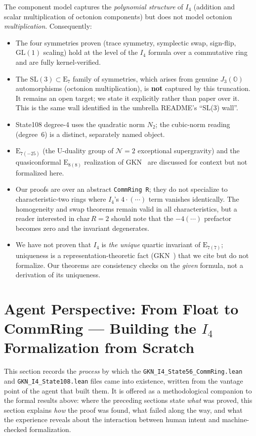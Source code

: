 \documentclass[11pt]{article}
\theoremstyle{definition}
\newcommand{\OO}{\mathbb{O}}
\newcommand{\Jthree}{J_3(\OO)}
\newcommand{\Iq}{I_4}
\newcommand{\Esevenc}{\mathrm{E}_{7(7)}}
\begin{document}
The component model captures the \emph{polynomial structure} of $\Iq$ (addition
and scalar multiplication of octonion components) but does not model octonion
\emph{multiplication}. Consequently:
\begin{itemize}[leftmargin=2em]
\item The four symmetries proven (trace symmetry, symplectic swap, sign-flip,
$\mathrm{GL}(1)$ scaling) hold at the level of the $\Iq$ formula over a
commutative ring and are fully kernel-verified.
\item The $\mathrm{SL}(3)\subset\mathrm{E}_7$ family of symmetries, which
arises from genuine $\Jthree$ automorphisms (octonion multiplication), is
\textbf{not} captured by this truncation. It remains an open target; we state
it explicitly rather than paper over it. This is the same wall identified in
the umbrella README's ``SL(3) wall''.
\item State108 degree-4 uses the quadratic norm $N_2$; the cubic-norm reading
(degree~6) is a distinct, separately named object.
\item $\mathrm{E}_{7(-25)}$ (the U-duality group of $\mathcal{N}=2$
exceptional supergravity) and the quasiconformal $\mathrm{E}_{8(8)}$
realization of GKN~\cite{gkn2001} are discussed for context but not
formalized here.
\item Our proofs are over an abstract \texttt{CommRing R}; they do not specialize
to characteristic-two rings where $\Iq$'s $4\cdot(\cdots)$ term vanishes
identically. The homogeneity and swap theorems remain valid in all
characteristics, but a reader interested in $\mathrm{char}\,R=2$ should note
that the $-4(\cdots)$ prefactor becomes zero and the invariant degenerates.
\item We have not proven that $\Iq$ is \emph{the unique} quartic invariant of
$\Esevenc$; uniqueness is a representation-theoretic fact (GKN~\cite{gkn2001})
that we cite but do not formalize. Our theorems are consistency checks on the
\emph{given} formula, not a derivation of its uniqueness.
\end{itemize}

\section{Agent Perspective: From Float to CommRing --- Building the
$\Iq$ Formalization from Scratch}
\label{sec:agent}

This section records the \emph{process} by which the
\texttt{GKN\_I4\_State56\_CommRing.lean} and
\texttt{GKN\_I4\_State108.lean} files came into existence, written from the
vantage point of the agent that built them. It is offered as a
methodological companion to the formal results above: where the preceding
sections state \emph{what} was proved, this section explains \emph{how}
the proof was found, what failed along the way, and what the experience
reveals about the interaction between human intent and machine-checked
formalization.
\end{document}
